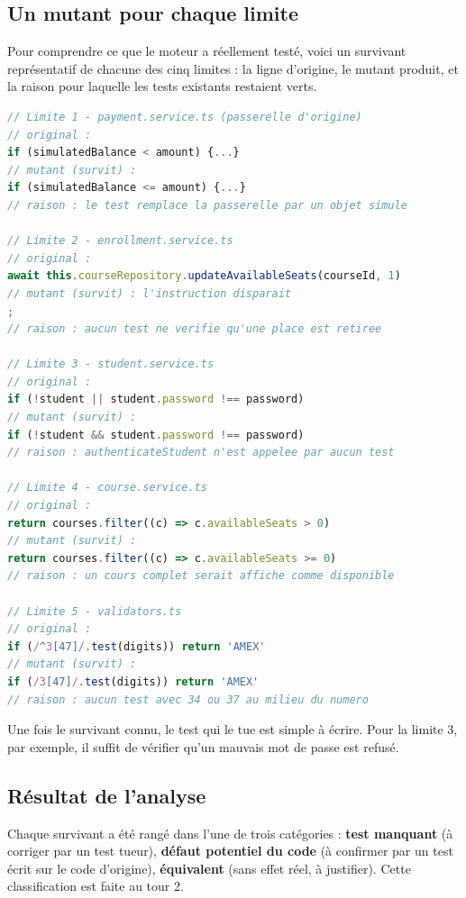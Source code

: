 \documentclass[12pt,a4paper]{article}
\begin{document}
\subsection{Un mutant pour chaque limite}
Pour comprendre ce que le moteur a réellement testé, voici un survivant représentatif de chacune des cinq limites : la ligne d'origine, le mutant produit, et la raison pour laquelle les tests existants restaient verts.
\begin{lstlisting}[language=typescript]
// Limite 1 - payment.service.ts (passerelle d'origine)
// original :
if (simulatedBalance < amount) {...}
// mutant (survit) :
if (simulatedBalance <= amount) {...}
// raison : le test remplace la passerelle par un objet simule

// Limite 2 - enrollment.service.ts
// original :
await this.courseRepository.updateAvailableSeats(courseId, 1)
// mutant (survit) : l'instruction disparait
;
// raison : aucun test ne verifie qu'une place est retiree

// Limite 3 - student.service.ts
// original :
if (!student || student.password !== password)
// mutant (survit) :
if (!student && student.password !== password)
// raison : authenticateStudent n'est appelee par aucun test

// Limite 4 - course.service.ts
// original :
return courses.filter((c) => c.availableSeats > 0)
// mutant (survit) :
return courses.filter((c) => c.availableSeats >= 0)
// raison : un cours complet serait affiche comme disponible

// Limite 5 - validators.ts
// original :
if (/^3[47]/.test(digits)) return 'AMEX'
// mutant (survit) :
if (/3[47]/.test(digits)) return 'AMEX'
// raison : aucun test avec 34 ou 37 au milieu du numero
\end{lstlisting}
Une fois le survivant connu, le test qui le tue est simple à écrire. Pour la limite 3, par exemple, il suffit de vérifier qu'un mauvais mot de passe est refusé.

\subsection{Résultat de l'analyse}
Chaque survivant a été rangé dans l'une de trois catégories : \textbf{test manquant} (à corriger par un test tueur), \textbf{défaut potentiel du code} (à confirmer par un test écrit sur le code d'origine), \textbf{équivalent} (sans effet réel, à justifier). Cette classification est faite au tour 2.

\end{document}
